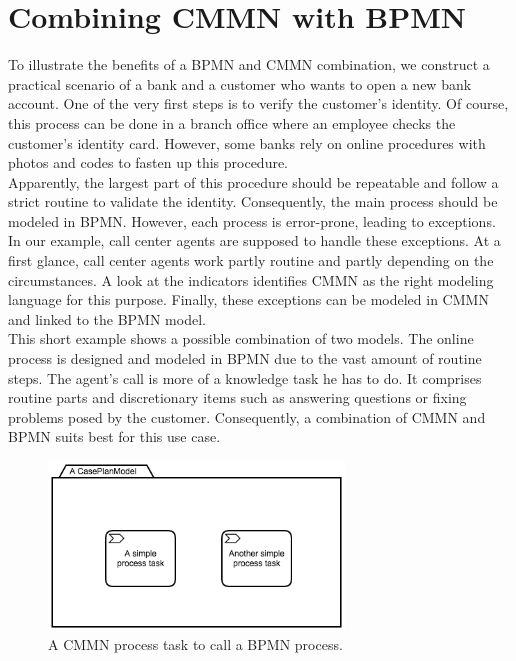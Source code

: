 \section{Combining CMMN with BPMN}
To illustrate the benefits of a BPMN and CMMN combination, we construct a practical scenario of a bank and a customer who wants to open a new bank account. One of the very first steps is to verify the customer's identity. Of course, this process can be done in a branch office where an employee checks the customer's identity card. However, some banks rely on online procedures with photos and codes to fasten up this procedure.\\
Apparently, the largest part of this procedure should be repeatable and follow a strict routine to validate the identity. Consequently, the main process should be modeled in BPMN. However, each process is error-prone, leading to exceptions. In our example, call center agents are supposed to handle these exceptions. At a first glance, call center agents work partly routine and partly depending on the circumstances. A look at the indicators identifies CMMN as the right modeling language for this purpose. Finally, these exceptions can be modeled in CMMN and linked to the BPMN model. 
 \\
This short example shows a possible combination of two models. The online process is designed and modeled in BPMN due to the vast amount of routine steps. The agent's call is more of a knowledge task he has to do. It comprises routine parts and discretionary items such as answering questions or fixing problems posed by the customer. Consequently, a combination of CMMN and BPMN suits best for this use case. 

\begin{figure}
  \centering
    \includegraphics[width=0.7\textwidth]{../figures/chapter_combinations/CMMN_Process_Tasks.png}
      \caption{A CMMN process task to call a BPMN process.}
      \label{fig:CMMN_process_task}
\end{figure}

